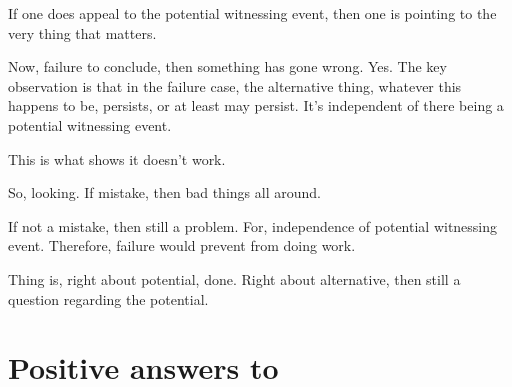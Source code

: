 \begin{note}
  If one does appeal to the potential witnessing event, then one is pointing to the very thing that matters.

  Now, failure to conclude, then something has gone wrong.
  Yes.
  The key observation is that in the failure case, the alternative thing, whatever this happens to be, persists, or at least may persist.
  It's independent of there being a potential witnessing event.

  This is what shows it doesn't work.

  So, looking.
  If mistake, then bad things all around.

  If not a mistake, then still a problem.
  For, independence of potential witnessing event.
  Therefore, failure would prevent from doing work.

  Thing is, right about potential, done.
  Right about alternative, then still a question regarding the potential.
\end{note}

\section{Positive answers to \qzS{}}
\label{sec:positive-answers-qzs}

